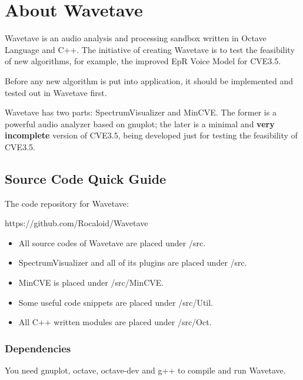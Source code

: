 \section{About Wavetave}\indent

        Wavetave is an audio analysis and processing sandbox written in Octave Language and C++. The initiative of creating Wavetave is to test the feasibility of new algorithms, for example, the improved EpR Voice Model for CVE3.5.
        
        Before any new algorithm is put into application, it should be implemented and tested out in Wavetave first.
        
        \bigskip
        
        Wavetave has two parts: SpectrumVisualizer and MinCVE. The former is a powerful audio analyzer based on gnuplot; the later is a minimal and \textbf{very incomplete} version of CVE3.5, being developed just for testing the feasibility of CVE3.5.
        
\subsection{Source Code Quick Guide}\indent

        The code repository for Wavetave:
        
        https://github.com/Rocaloid/Wavetave
        
        \bigskip
        
        \begin{itemize}
                \item All source codes of Wavetave are placed under /src.
                \item SpectrumVisualizer and all of its plugins are placed under /src.
                \item MinCVE is placed under /src/MinCVE.
                \item Some useful code snippets are placed under /src/Util.
                \item All C++ written modules are placed under /src/Oct.
        \end{itemize}
        
        \subsubsection{Dependencies}\indent
        
        You need gnuplot, octave, octave-dev and g++ to compile and run Wavetave.
        
